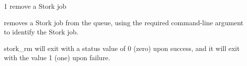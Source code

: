 \begin{ManPage}{\label{man-stork-rm}}{1}
{remove a Stork job}
\Synopsis {}
\ToolArgsBase

\Storkname
{}



\Description 

 removes a Stork job from the queue,
using the required command-line argument to identify the Stork job.


\begin{Options}
	\ToolArgsBaseDesc
	\StorknameDesc
\end{Options}

\ExitStatus

stork\_rm will exit with a status value of 0 (zero) upon success,
and it will exit with the value 1 (one) upon failure.

\end{ManPage}
